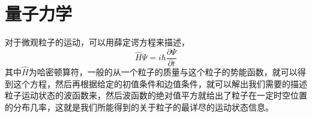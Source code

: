 \section{量子力学}
对于微观粒子的运动，可以用薛定谔方程来描述，
\begin{equation}
	\hat H \Psi = i \hbar \frac{\partial \Psi}{\partial t}
\end{equation}
其中$\hat H $为哈密顿算符，一般的从一个粒子的质量与这个粒子的势能函数，就可以得到这个方程，然后再根据给定的初值条件和边值条件，就可以解出我们需要的描述粒子运动状态的波函数来，然后波函数的绝对值平方就给出了粒子在一定时空位置的分布几率，这就是我们所能得到的关于粒子的最详尽的运动状态信息。


